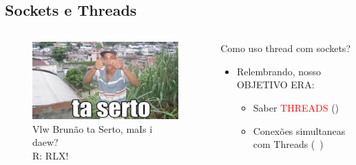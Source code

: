 \documentclass[10pt, xcolor=x11names]{beamer}
\begin{document}
\subsection{Sockets e Threads}
\begin{frame}
	\begin{columns}
			\begin{figure}
				\includegraphics[width=.8\linewidth]{img/taserto.png}
				\caption{Vlw Brunão ta Serto, maIs i daew? \\R: RLX!}
			\end{figure}
		

		\begin{block}{Como uso thread com sockets?}
			\begin{itemize}
				\item Relembrando, nosso OBJETIVO ERA:
					\begin{itemize}
						\item Saber \textcolor{red}{THREADS} (\checkmark)
						\item Conexões simultaneas com Threads (~)
					\end{itemize}
			\end{itemize}
		\end{block}
		
	\end{columns}
\end{frame}
\end{document}
